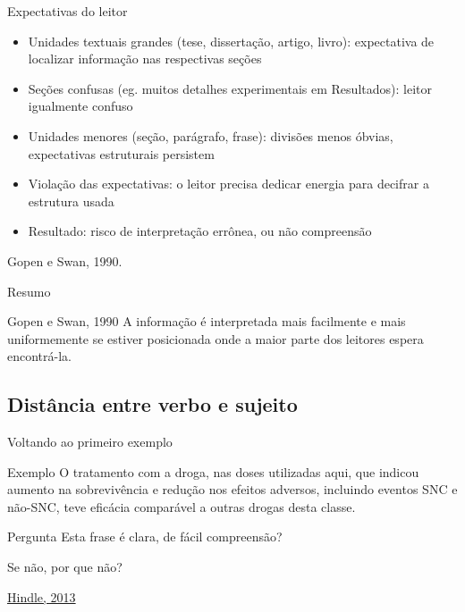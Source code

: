 \documentclass{beamer}
\begin{document}
\begin{frame}{Expectativas do leitor}
  \begin{itemize}
    \footnotesize
  \item<1-> Unidades textuais grandes (tese, dissertação, artigo, livro):
    \alert<-2>{expectativa} de localizar informação nas respectivas
    seções
    \medskip
  \item<2-> Seções confusas (eg. muitos detalhes experimentais em
    Resultados): leitor igualmente confuso
    \medskip
  \item<3-> Unidades menores (seção, parágrafo, frase): divisões menos
    óbvias, \alert<3>{expectativas estruturais persistem}
    \medskip
  \item<4-> Violação das expectativas: o \alert{leitor precisa dedicar
      energia} para decifrar a estrutura usada
    \medskip
  \item<5-> Resultado: risco de interpretação errônea, ou não compreensão
  \end{itemize}

\vfill
Gopen e Swan, 1990.
\end{frame}

\begin{frame}{Resumo}
  \begin{block}{Gopen e Swan, 1990}
    A informação é interpretada mais facilmente e mais uniformemente
    se estiver posicionada onde a maior parte dos leitores espera
    encontrá-la.
  \end{block}
\end{frame}

\subsection{Distância entre verbo e sujeito}

\begin{frame}{Voltando ao primeiro exemplo}
  \begin{exampleblock}{Exemplo}
    \footnotesize
    O \alert<2>{tratamento com a droga}, nas doses utilizadas aqui, que
    indicou aumento na sobrevivência e redução nos efeitos adversos,
    incluindo eventos SNC e não-SNC, \alert<2>{teve} eficácia
    comparável a outras drogas desta classe.
  \end{exampleblock}

  \begin{block}{Pergunta}
    \scriptsize
    Esta frase é clara, de fácil compreensão?

    \bigskip
    Se não, por que não?
  \end{block}

  \vfill
  \scriptsize
  \hfill \href{https://web.archive.org/web/20150512001938/http://www.edanzediting.com/blog/reader_expectations_subject_verb_placement}
  {Hindle, 2013}
\end{frame}
\end{document}
